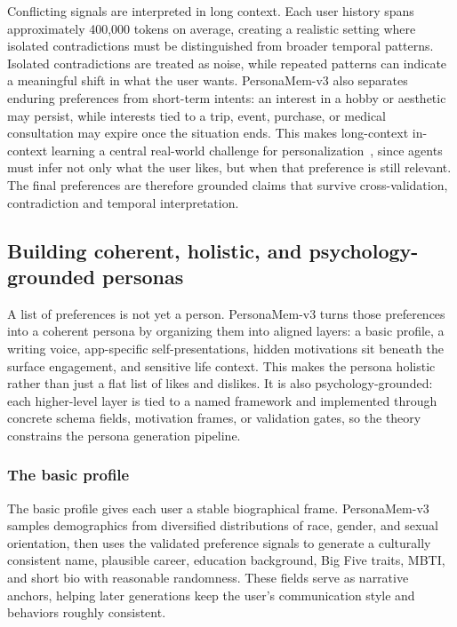 \documentclass[]{fairmeta}
\begin{document}
Conflicting signals are interpreted in long context. Each user history spans approximately 400,000 tokens on average, creating a realistic setting where isolated contradictions must be distinguished from broader temporal patterns. Isolated contradictions are treated as noise, while repeated patterns can indicate a meaningful shift in what the user wants. PersonaMem-v3 also separates enduring preferences from short-term intents: an interest in a hobby or aesthetic may persist, while interests tied to a trip, event, purchase, or medical consultation may expire once the situation ends. This makes long-context in-context learning a central real-world challenge for personalization~\citep{dou2026cl, jiang2025know, bai2025longbench, li2024long}, since agents must infer not only what the user likes, but when that preference is still relevant. The final preferences are therefore grounded claims that survive cross-validation, contradiction and temporal interpretation.


\subsection{Building coherent, holistic, and psychology-grounded personas}
\label{subsec:persona_aggregation}

A list of preferences is not yet a person. PersonaMem-v3 turns those preferences into a coherent persona by organizing them into aligned layers: a basic profile, a writing voice, app-specific self-presentations, hidden motivations sit beneath the surface engagement, and sensitive life context. This makes the persona holistic rather than just a flat list of likes and dislikes. It is also psychology-grounded: each higher-level layer is tied to a named framework and implemented through concrete schema fields, motivation frames, or validation gates, so the theory constrains the persona generation pipeline.


\subsubsection{The basic profile}
\label{subsubsec:basic_profile}

The basic profile gives each user a stable biographical frame. PersonaMem-v3 samples demographics from diversified distributions of race, gender, and sexual orientation, then uses the validated preference signals to generate a culturally consistent name, plausible career, education background, Big Five traits, MBTI, and short bio with reasonable randomness. These fields serve as narrative anchors, helping later generations keep the user’s communication style and behaviors roughly consistent.
\end{document}

